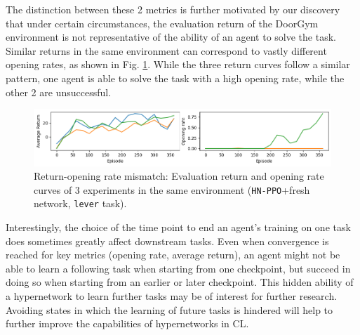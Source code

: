 \documentclass[dvipsnames]{article} %
\newcommand{\comment}[1]{}
\newcommand{\sa}[1] {\comment{{\color{cyan} SA: #1}}}                %
\newcommand{\jh}[1] {\comment{{\color{RawSienna} JH: #1}}}           %
\newcommand{\as}[1] {\comment{{\color{orange} AS: #1}}}              %
\begin{document}
The distinction between these 2 metrics is further motivated by our discovery that under certain circumstances, the evaluation return of the DoorGym environment is not representative of the ability of an agent to solve the task. Similar returns in the same environment can correspond to vastly different opening rates, as shown in Fig. \ref{fig:return_opening_rate}. While the three return curves follow a similar pattern, one agent is able to solve the task with a high opening rate, while the other 2 are unsuccessful.

\begin{figure}[htbp]
\begin{center}
\includegraphics[width=1.0\linewidth]{images/return_opening_rate.png}
\end{center}
\caption{Return-opening rate mismatch: Evaluation return and opening rate curves of 3 experiments in the same environment (\texttt{HN-PPO}+fresh network, \texttt{lever} task).}
\label{fig:return_opening_rate}
\end{figure}

Interestingly, the choice of the time point to end an agent's training on one task does sometimes greatly affect downstream tasks. Even when convergence is reached for key metrics (opening rate, average return), an agent might not be able to learn a following task when starting from one checkpoint, but succeed in doing so when starting from an earlier or later checkpoint. This hidden ability of a hypernetwork to learn further tasks may be of interest for further research. Avoiding states in which the learning of future tasks is hindered will help to further improve the capabilities of hypernetworks in CL.
\end{document}
